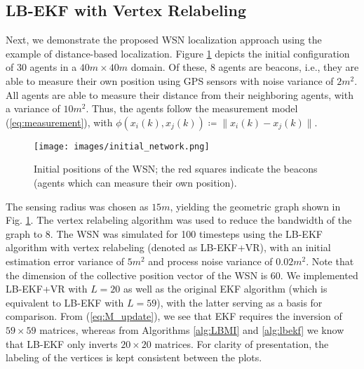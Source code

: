 \documentclass[twocolumn]{article}
\theoremstyle{plain}
\theoremstyle{definition}
\theoremstyle{definition}
\theoremstyle{remark}
\begin{document}
\subsection{LB-EKF with Vertex Relabeling} Next, we demonstrate the proposed WSN localization approach using the example of distance-based localization. Figure \ref{fig:network_init} depicts the initial configuration of $30$ agents in a $40m \times 40m$ domain. Of these, $8$ agents are beacons, i.e., they are able to measure their own position using GPS sensors with noise variance of $2 m^2$. All agents are able to measure their distance from their neighboring agents, with a variance of $10 m^2$. Thus, the agents follow the measurement model (\ref{eq:measurement}), with $\phi(x_i(k), x_j(k)) \coloneqq \|x_i(k) - x_j(k)\|$.
\begin{figure}[h]
\centering
\texttt{[image: images/initial\_network.png]}
\caption{Initial positions of the WSN; the red squares indicate the beacons (agents which can measure their own position).}
\label{fig:network_init}
\end{figure}
The sensing radius was chosen as $15m$, yielding the geometric graph shown in Fig. \ref{fig:network_init}. The vertex relabeling algorithm was used to reduce the bandwidth of the graph to $8$. The WSN was simulated for 100 timesteps using the LB-EKF algorithm with vertex relabeling (denoted as LB-EKF+VR), with an initial estimation error variance of $5m^2$ and process noise variance of $0.02 m^2$. Note that the dimension of the collective position vector of the WSN is $60$. We implemented LB-EKF+VR with $L=20$ as well as the original EKF algorithm (which is equivalent to LB-EKF with $L=59$), with the latter serving as a basis for comparison.
From (\ref{eq:M_update}), we see that EKF requires the inversion of $59 \times 59$ matrices, whereas from Algorithms \ref{alg:LBMI} and \ref{alg:lbekf} we know that LB-EKF only inverts $20\times 20$ matrices. For clarity of presentation, the labeling of the vertices is kept consistent between the plots.
\end{document}
